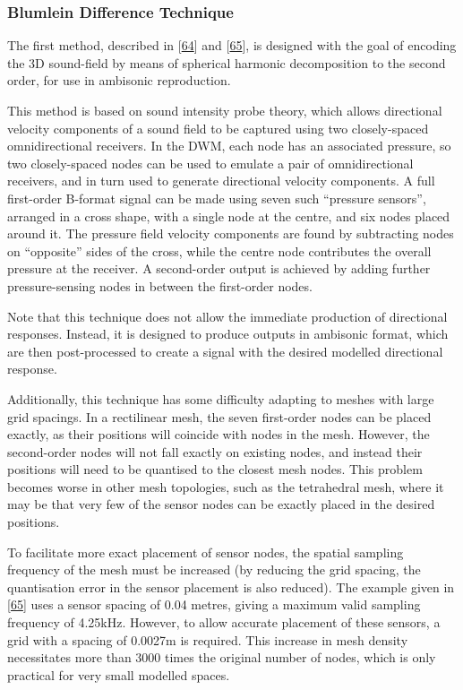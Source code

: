 \documentclass[]{scrreprt}
\begin{document}
\subsubsection{Blumlein Difference
Technique}\label{blumlein-difference-technique}

The first method, described in
{[}\protect\hyperlink{ref-southernux5fmethodsux5f2007}{64}{]} and
{[}\protect\hyperlink{ref-southernux5f2ndux5f2007}{65}{]}, is designed
with the goal of encoding the 3D sound-field by means of spherical
harmonic decomposition to the second order, for use in ambisonic
reproduction.

This method is based on sound intensity probe theory, which allows
directional velocity components of a sound field to be captured using
two closely-spaced omnidirectional receivers. In the DWM, each node has
an associated pressure, so two closely-spaced nodes can be used to
emulate a pair of omnidirectional receivers, and in turn used to
generate directional velocity components. A full first-order B-format
signal can be made using seven such ``pressure sensors'', arranged in a
cross shape, with a single node at the centre, and six nodes placed
around it. The pressure field velocity components are found by
subtracting nodes on ``opposite'' sides of the cross, while the centre
node contributes the overall pressure at the receiver. A second-order
output is achieved by adding further pressure-sensing nodes in between
the first-order nodes.

Note that this technique does not allow the immediate production of
directional responses. Instead, it is designed to produce outputs in
ambisonic format, which are then post-processed to create a signal with
the desired modelled directional response.

Additionally, this technique has some difficulty adapting to meshes with
large grid spacings. In a rectilinear mesh, the seven first-order nodes
can be placed exactly, as their positions will coincide with nodes in
the mesh. However, the second-order nodes will not fall exactly on
existing nodes, and instead their positions will need to be quantised to
the closest mesh nodes. This problem becomes worse in other mesh
topologies, such as the tetrahedral mesh, where it may be that very few
of the sensor nodes can be exactly placed in the desired positions.

To facilitate more exact placement of sensor nodes, the spatial sampling
frequency of the mesh must be increased (by reducing the grid spacing,
the quantisation error in the sensor placement is also reduced). The
example given in
{[}\protect\hyperlink{ref-southernux5f2ndux5f2007}{65}{]} uses a sensor
spacing of 0.04 metres, giving a maximum valid sampling frequency of
4.25kHz. However, to allow accurate placement of these sensors, a grid
with a spacing of 0.0027m is required. This increase in mesh density
necessitates more than 3000 times the original number of nodes, which is
only practical for very small modelled spaces.
\end{document}
